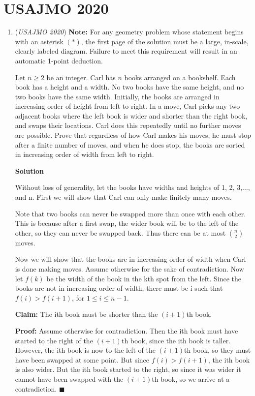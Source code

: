 \section{USAJMO 2020}
        \begin{enumerate}
        	\item (\textit{USAJMO 2020}) \textbf{Note:} For any geometry problem whose statement begins with an asterisk $(*)$, the first page of the solution must be a large, in-scale, clearly labeled diagram. Failure to meet this requirement will result in an automatic 1-point deduction.


 Let $n \geq 2$ be an integer. Carl has $n$ books arranged on a bookshelf. Each book has a height and a width. No two books have the same height, and no two books have the same width. Initially, the books are arranged in increasing order of height from left to right. In a move, Carl picks any two adjacent books where the left book is wider and shorter than the right book, and swaps their locations. Carl does this repeatedly until no further moves are possible.  Prove that regardless of how Carl makes his moves, he must stop after a finite number of moves, and when he does stop, the books are sorted in increasing order of width from left to right.


 



\textbf{Solution}

Without loss of generality, let the books have widths and heights of 1, 2, 3,..., and n. First we will show that Carl can only make finitely many moves.

 Note that two books can never be swapped more than once with each other. This is because after a first swap, the wider book will be to the left of the other, so they can never be swapped back. Thus there can be at most ${n\choose 2}$ moves.

 Now we will show that the books are in increasing order of width when Carl is done making moves. Assume otherwise for the sake of contradiction. Now let $f(k)$ be the width of the book in the kth spot from the left. Since the books are not in increasing order of width, there must be i such that $f(i)>f(i+1)$, for $1\leq i\leq n-1$. 

 \textbf{Claim:} The ith book must be shorter than the $(i+1)$th book. 

 \textbf{Proof:} Assume otherwise for contradiction. Then the ith book must have started to the right of the $(i+1)$th book, since the ith book is taller. However, the ith book is now to the left of the $(i+1)$th book, so they must have been swapped at some point. But since $f(i)>f(i+1)$, the ith book is also wider. But the ith book started to the right, so since it was wider it cannot have been swapped with the $(i+1)$th book, so we arrive at a contradiction. $\blacksquare$


\end{enumerate}
